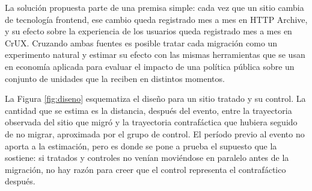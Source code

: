 \documentclass[12pt, a4paper]{article}
\begin{document}
La solución propuesta parte de una premisa simple: cada vez que un sitio cambia de tecnología frontend, ese cambio queda registrado mes a mes en HTTP Archive, y su efecto sobre la experiencia de los usuarios queda registrado mes a mes en CrUX. Cruzando ambas fuentes es posible tratar cada migración como un experimento natural y estimar su efecto con las mismas herramientas que se usan en economía aplicada para evaluar el impacto de una política pública sobre un conjunto de unidades que la reciben en distintos momentos.

La Figura \ref{fig:diseno} esquematiza el diseño para un sitio tratado y su control. La cantidad que se estima es la distancia, después del evento, entre la trayectoria observada del sitio que migró y la trayectoria contrafáctica que hubiera seguido de no migrar, aproximada por el grupo de control. El período previo al evento no aporta a la estimación, pero es donde se pone a prueba el supuesto que la sostiene: si tratados y controles no venían moviéndose en paralelo antes de la migración, no hay razón para creer que el control representa el contrafáctico después.
\end{document}
